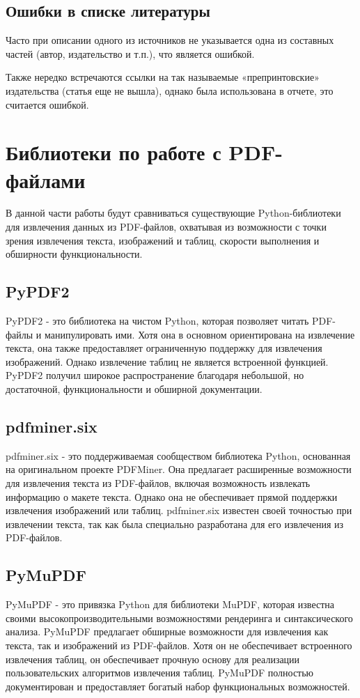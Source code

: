 \subsection{Ошибки в списке литературы}
Часто при описании одного из источников не указывается одна из составных частей (автор, издательство и т.п.), что является ошибкой.

Также нередко встречаются ссылки на так называемые «препринтовские» издательства (статья еще не вышла), однако была использована в отчете, это считается ошибкой.

\section{Библиотеки по работе с PDF-файлами}
В данной части работы будут сравниваться существующие Python-библиотеки для извлечения данных из PDF-файлов, охватывая из возможности с точки зрения извлечения текста, изображений и таблиц, скорости выполнения и обширности функциональности.
\subsection{PyPDF2}
PyPDF2 - это библиотека на чистом Python, которая позволяет читать PDF-файлы и манипулировать ими. Хотя она в основном ориентирована на извлечение текста, она также предоставляет ограниченную поддержку для извлечения изображений. Однако извлечение таблиц не является встроенной функцией. PyPDF2 получил широкое распространение благодаря небольшой, но достаточной, функциональности и обширной документации.
\subsection{pdfminer.six}
pdfminer.six - это поддерживаемая сообществом библиотека Python, основанная на оригинальном проекте PDFMiner. Она предлагает расширенные возможности для извлечения текста из PDF-файлов, включая возможность извлекать информацию о макете текста. Однако она не обеспечивает прямой поддержки извлечения изображений или таблиц. pdfminer.six известен своей точностью при извлечении текста, так как была специально разработана для его извлечения из PDF-файлов.
\subsection{PyMuPDF}
PyMuPDF - это привязка Python для библиотеки MuPDF, которая известна своими высокопроизводительными возможностями рендеринга и синтаксического анализа. PyMuPDF предлагает обширные возможности для извлечения как текста, так и изображений из PDF-файлов. Хотя он не обеспечивает встроенного извлечения таблиц, он обеспечивает прочную основу для реализации пользовательских алгоритмов извлечения таблиц. PyMuPDF полностью документирован и предоставляет богатый набор функциональных возможностей.

